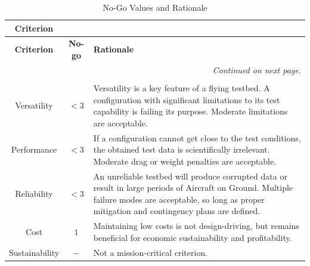 \begin{longtable}{|c|c|p{13cm}|}
\caption{No-Go Values and Rationale}
\label{tab:no-go} \\

\hline
\textbf{Criterion} & \centering{\textbf{No-go}} & \centering{\textbf{Rationale}} \tabularnewline
\hline\hline
\endfirsthead

\hline
\textbf{Criterion} & \textbf{No-go} & \textbf{Rationale} \\
\hline\hline
\endhead

\hline
\multicolumn{3}{r}{\textit{Continued on next page.}} \\
\endfoot

\hline
\endlastfoot

\multicolumn{3}{|c|}{\textbf{Configuration Selection}} \\
\hline

Versatility & $<3$ &
Versatility is a key feature of a flying testbed. A configuration with significant limitations to its test capability is failing its purpose. Moderate limitations are acceptable.
\\ \hline

Performance & $<3$ &
If a configuration cannot get close to the test conditions, the obtained test data is scientifically irrelevant. Moderate drag or weight penalties are acceptable.
\\ \hline

Reliability & $<3$ &
An unreliable testbed will produce corrupted data or result in large periods of Aircraft on Ground. Multiple failure modes are acceptable, so long as proper mitigation and contingency plans are defined.
\\ \hline

Cost & $1$ &
Maintaining low costs is not design-driving, but remains beneficial for economic sustainability and profitability.
\\ \hline

Sustainability & $-$ &
Not a mission-critical criterion.
\\ \hline
\end{longtable}

